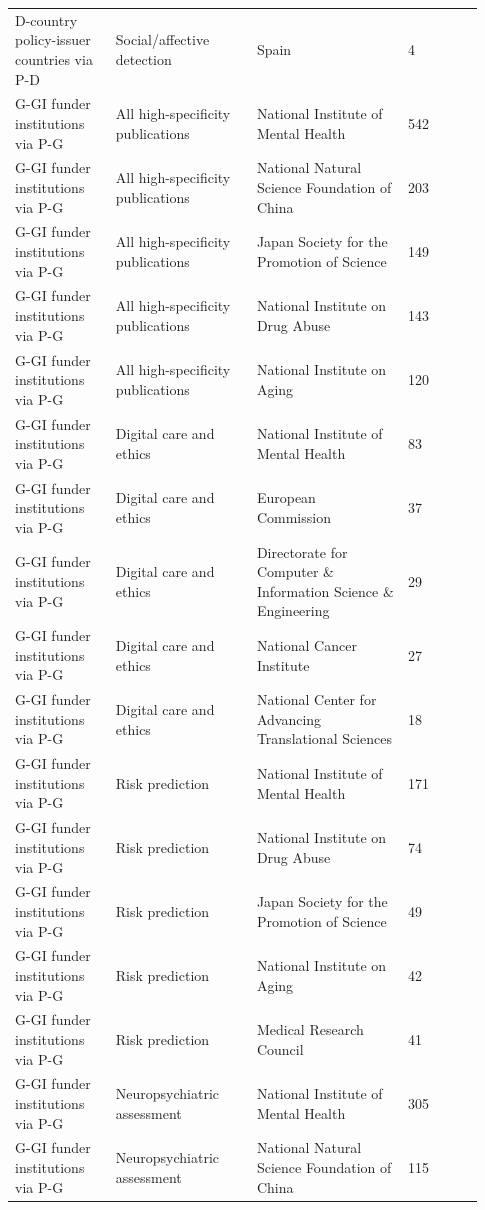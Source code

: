 \documentclass[11pt]{article}
\begin{document}
\begin{longtable}{@{}p{0.2\linewidth}@{\hspace{0.4em}}p{0.28\linewidth}@{\hspace{0.4em}}p{0.3\linewidth}@{\hspace{0.4em}}p{0.15\linewidth}@{}}
D-country policy-issuer countries via P-D & Social/affective detection & Spain & 4 \\
G-GI funder institutions via P-G & All high-specificity publications & National Institute of Mental Health & 542 \\
G-GI funder institutions via P-G & All high-specificity publications & National Natural Science Foundation of China & 203 \\
G-GI funder institutions via P-G & All high-specificity publications & Japan Society for the Promotion of Science & 149 \\
G-GI funder institutions via P-G & All high-specificity publications & National Institute on Drug Abuse & 143 \\
G-GI funder institutions via P-G & All high-specificity publications & National Institute on Aging & 120 \\
G-GI funder institutions via P-G & Digital care and ethics & National Institute of Mental Health & 83 \\
G-GI funder institutions via P-G & Digital care and ethics & European Commission & 37 \\
G-GI funder institutions via P-G & Digital care and ethics & Directorate for Computer \& Information Science \& Engineering & 29 \\
G-GI funder institutions via P-G & Digital care and ethics & National Cancer Institute & 27 \\
G-GI funder institutions via P-G & Digital care and ethics & National Center for Advancing Translational Sciences & 18 \\
G-GI funder institutions via P-G & Risk prediction & National Institute of Mental Health & 171 \\
G-GI funder institutions via P-G & Risk prediction & National Institute on Drug Abuse & 74 \\
G-GI funder institutions via P-G & Risk prediction & Japan Society for the Promotion of Science & 49 \\
G-GI funder institutions via P-G & Risk prediction & National Institute on Aging & 42 \\
G-GI funder institutions via P-G & Risk prediction & Medical Research Council & 41 \\
G-GI funder institutions via P-G & Neuropsychiatric assessment & National Institute of Mental Health & 305 \\
G-GI funder institutions via P-G & Neuropsychiatric assessment & National Natural Science Foundation of China & 115 \\

\end{longtable}
\end{document}
